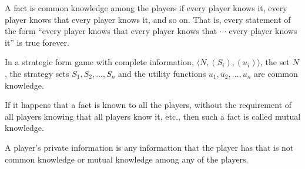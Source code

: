 \begin{defn}
    A fact is common knowledge among the players if every player knows it, every player knows that every player knows it, and so on. That is, every statement of the form ``every player knows that every player knows that $\cdots$ every player knows it'' is true forever.
    \begin{note}
    In a strategic form game with complete information, $\langle N,(S_i),(u_i)\rangle$, the set $N$, the strategy sets $S_1,S_2,\ldots,S_n$ and the utility functions $u_1,u_2,\ldots,u_n$ are common knowledge.
    \end{note}
\end{defn}
\begin{defn}
    If it happens that a fact is known to all the players, without the requirement of all players knowing that all players know it, etc., then such a fact is called mutual knowledge.
\end{defn}
\begin{defn}
    A player’s private information is any information that the player has that is not common knowledge or mutual knowledge among any of the players.
\end{defn}